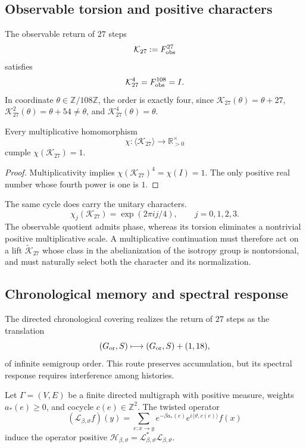 \subsection{Observable torsion and positive characters}

The observable return of \(27\) steps
\[
 \mathcal K_{27}:=F_{\rm obs}^{27}
\]
satisfies
\[
 \mathcal K_{27}^{4}=F_{\rm obs}^{108}=I.
\]
In coordinate \(\theta\in\mathbb Z/108\mathbb Z\), the order is
exactly four, since
\(\mathcal K_{27}(\theta)=\theta+27\),
\(\mathcal K_{27}^{2}(\theta)=\theta+54\neq\theta\), and
\(\mathcal K_{27}^{4}(\theta)=\theta\).

\begin{theorem}
\label{thm:caracter-positivo-G-rev11}
Every multiplicative homomorphism
\[
 \chi:\langle\mathcal K_{27}\rangle
 \longrightarrow\mathbb R_{>0}^{\times}
\]
cumple \(\chi(\mathcal K_{27})=1\).
\end{theorem}

\begin{proof}
Multiplicativity implies
\(\chi(\mathcal K_{27})^4=\chi(I)=1\).
The only positive real number whose fourth power is one is \(1\).
\end{proof}

The same cycle does carry the unitary characters.
\[
 \chi_j(\mathcal K_{27})=\exp(2\pi ij/4),
 \qquad j=0,1,2,3.
\]
The observable quotient admits phase, whereas its torsion eliminates a
nontrivial positive multiplicative scale. A multiplicative continuation must therefore
act on a lift \(\widetilde{\mathcal K}_{27}\) whose class in
the abelianization of the isotropy group is nontorsional, and must naturally select
both the character and its normalization.

\subsection{Chronological memory and spectral response}
\label{sec:respuesta-espectral-G-rev11}

The directed chronological covering realizes the return of \(27\) steps as the
translation
\[
 (G_{\rm or},S)\longmapsto(G_{\rm or},S)+(1,18),
\]
of infinite semigroup order. This route preserves accumulation, but its
spectral response requires interference among histories.

Let \(\Gamma=(V,E)\) be a finite directed multigraph with positive measure,
weights \(a_\ast(e)\geq0\), and cocycle \(c(e)\in\mathbb Z^2\). The twisted
operator
\[
 (\mathcal L_{\beta,\vartheta}f)(y)
 =\sum_{e:x\to y}
 e^{-\beta a_\ast(e)}e^{i\langle\vartheta,c(e)\rangle}f(x)
\]
induce the operator positive
\(\mathcal H_{\beta,\vartheta}
=\mathcal L_{\beta,\vartheta}^{*}\mathcal L_{\beta,\vartheta}\).

